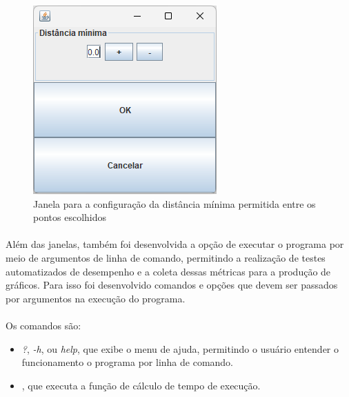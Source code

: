 \documentclass[12pt]{article}
\begin{document}
\begin{figure}[H]
    \centering
    \includegraphics[width=\textwidth]{Captura de tela 2024-06-01 111132}
    \caption{Janela para a configuração da distância mínima permitida entre os pontos escolhidos}
    \label{fig:fig-8}
\end{figure}

\paragraph{}Além das janelas, também foi desenvolvida a opção de executar o programa por meio de argumentos de linha de comando, permitindo a realização de testes automatizados de desempenho e a coleta dessas métricas para a produção de gráficos. Para isso foi desenvolvido comandos e opções que devem ser passados por argumentos na execução do programa.

\paragraph{}Os comandos são: 

\begin{itemize}
    \item \textit{?}, \textit{-h}, ou \textit{\-\-help}, que exibe o menu de ajuda, permitindo o usuário entender o funcionamento o programa por linha de comando.
    \item {}, que executa a função de cálculo de tempo de execução.
\end{itemize}
\end{document}
